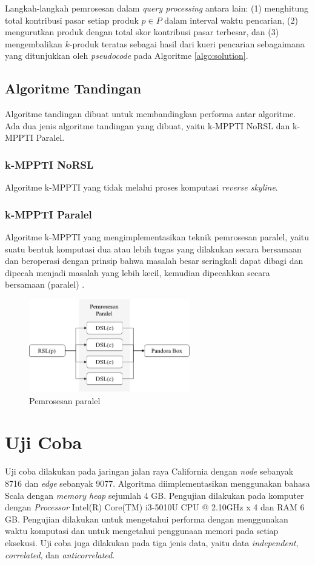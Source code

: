 \documentclass[conference]{IEEEtran}
\begin{document}
\pagebreak
Langkah-langkah pemrosesan dalam \textit{query processing} antara lain: (1) menghitung total kontribusi pasar setiap produk $p \in P$ dalam interval waktu pencarian, (2) mengurutkan produk dengan total skor kontribusi pasar terbesar, dan (3) mengembalikan $k$-produk teratas sebagai hasil dari kueri pencarian sebagaimana yang ditunjukkan oleh \textit{pseudocode} pada Algoritme \ref{algo:solution}.

\subsection{Algoritme Tandingan}
Algoritme tandingan dibuat untuk membandingkan performa antar algoritme. Ada dua jenis algoritme tandingan yang dibuat, yaitu k-MPPTI NoRSL dan k-MPPTI Paralel.

\subsubsection{\textbf{k-MPPTI NoRSL}}
Algoritme k-MPPTI yang tidak melalui proses komputasi \textit{reverse skyline}.

\subsubsection{\textbf{k-MPPTI Paralel}}
Algoritme k-MPPTI yang mengimplementasikan teknik pemrosesan paralel, yaitu suatu bentuk komputasi dua atau lebih tugas yang dilakukan secara bersamaan dan beroperasi dengan prinsip bahwa masalah besar seringkali dapat dibagi dan dipecah menjadi masalah yang lebih kecil, kemudian dipecahkan secara bersamaan (paralel) \cite{paralel}.

\begin{figure}[htbp]
	\centering
	\includegraphics[width=7cm]{img/bab3/paralel.png}
	\caption{Pemrosesan paralel}
	\label{fig:paralel}
\end{figure}

\section{Uji Coba}
Uji coba dilakukan pada jaringan jalan raya California\cite{ontrip} dengan \textit{node} sebanyak 8716 dan \textit{edge} sebanyak 9077. Algoritma diimplementasikan menggunakan bahasa Scala dengan \textit{memory heap} sejumlah 4 GB. Pengujian dilakukan pada komputer dengan \textit{Processor} Intel(R) Core(TM) i3-5010U CPU @ 2.10GHz x 4 dan RAM 6 GB. Pengujian dilakukan untuk mengetahui performa dengan menggunakan waktu komputasi dan untuk mengetahui penggunaan memori pada setiap eksekusi. Uji coba juga dilakukan pada tiga jenis data, yaitu data \textit{independent}, \textit{correlated}, dan \textit{anticorrelated}.
\end{document}
